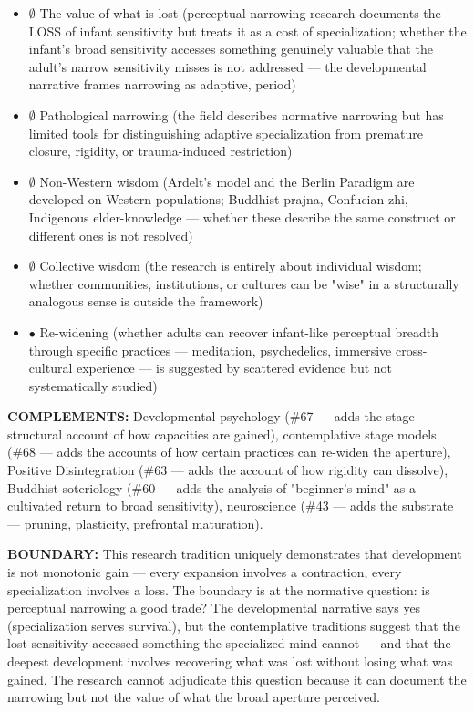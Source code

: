 \begin{itemize}[nosep,leftmargin=*]
  \item $\emptyset$ The value of what is lost (perceptual narrowing research documents the LOSS of infant sensitivity but treats it as a cost of specialization; whether the infant's broad sensitivity accesses something genuinely valuable that the adult's narrow sensitivity misses is not addressed — the developmental narrative frames narrowing as adaptive, period)
  \item $\emptyset$ Pathological narrowing (the field describes normative narrowing but has limited tools for distinguishing adaptive specialization from premature closure, rigidity, or trauma-induced restriction)
  \item $\emptyset$ Non-Western wisdom (Ardelt's model and the Berlin Paradigm are developed on Western populations; Buddhist prajna, Confucian zhi, Indigenous elder-knowledge — whether these describe the same construct or different ones is not resolved)
  \item $\emptyset$ Collective wisdom (the research is entirely about individual wisdom; whether communities, institutions, or cultures can be "wise" in a structurally analogous sense is outside the framework)
  \item $\bullet$ Re-widening (whether adults can recover infant-like perceptual breadth through specific practices — meditation, psychedelics, immersive cross-cultural experience — is suggested by scattered evidence but not systematically studied)
\end{itemize}


\textbf{COMPLEMENTS:} Developmental psychology (\#67 — adds the stage-structural account of how capacities are gained), contemplative stage models (\#68 — adds the accounts of how certain practices can re-widen the aperture), Positive Disintegration (\#63 — adds the account of how rigidity can dissolve), Buddhist soteriology (\#60 — adds the analysis of "beginner's mind" as a cultivated return to broad sensitivity), neuroscience (\#43 — adds the substrate — pruning, plasticity, prefrontal maturation).


\textbf{BOUNDARY:} This research tradition uniquely demonstrates that development is not monotonic gain — every expansion involves a contraction, every specialization involves a loss. The boundary is at the normative question: is perceptual narrowing a good trade? The developmental narrative says yes (specialization serves survival), but the contemplative traditions suggest that the lost sensitivity accessed something the specialized mind cannot — and that the deepest development involves recovering what was lost without losing what was gained. The research cannot adjudicate this question because it can document the narrowing but not the value of what the broad aperture perceived.


